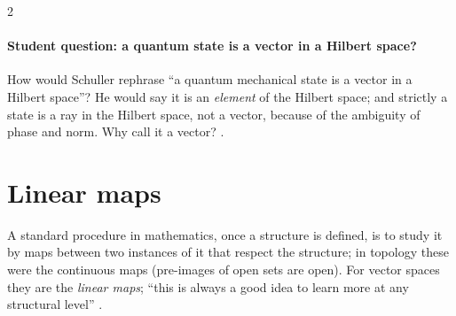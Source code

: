 \begin{paracol}{2}
\paragraph{Student question: a quantum state is a vector in a Hilbert space?} How would Schuller rephrase ``a quantum mechanical state is a vector in a Hilbert space''? He would say it is an \emph{element} of the Hilbert space; and
strictly a state is a ray in the Hilbert space, not a vector, because of the ambiguity of phase and norm. Why call it a vector? .

\section{Linear maps}\label{sec:c03-linear}

A standard procedure in mathematics, once a structure is defined, is to study it by maps between two instances of it that respect the structure; in topology these were the continuous maps (pre-images of open sets are open). For vector spaces they are the
\emph{linear maps}; ``this is always a good idea to learn more at any structural level'' .


\end{paracol}
